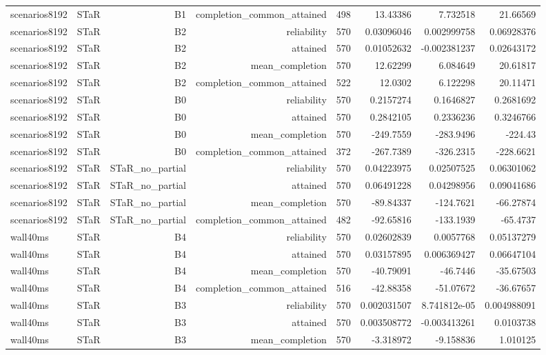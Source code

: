 \begin{longtable}{llrrrrrr}
scenarios8192 & STaR & B1 & completion\_common\_attained & 498 & 13.43386 & 7.732518 & 21.66569 \\
scenarios8192 & STaR & B2 & reliability & 570 & 0.03096046 & 0.002999758 & 0.06928376 \\
scenarios8192 & STaR & B2 & attained & 570 & 0.01052632 & -0.002381237 & 0.02643172 \\
scenarios8192 & STaR & B2 & mean\_completion & 570 & 12.62299 & 6.084649 & 20.61817 \\
scenarios8192 & STaR & B2 & completion\_common\_attained & 522 & 12.0302 & 6.122298 & 20.11471 \\
scenarios8192 & STaR & B0 & reliability & 570 & 0.2157274 & 0.1646827 & 0.2681692 \\
scenarios8192 & STaR & B0 & attained & 570 & 0.2842105 & 0.2336236 & 0.3246766 \\
scenarios8192 & STaR & B0 & mean\_completion & 570 & -249.7559 & -283.9496 & -224.43 \\
scenarios8192 & STaR & B0 & completion\_common\_attained & 372 & -267.7389 & -326.2315 & -228.6621 \\
scenarios8192 & STaR & STaR\_no\_partial & reliability & 570 & 0.04223975 & 0.02507525 & 0.06301062 \\
scenarios8192 & STaR & STaR\_no\_partial & attained & 570 & 0.06491228 & 0.04298956 & 0.09041686 \\
scenarios8192 & STaR & STaR\_no\_partial & mean\_completion & 570 & -89.84337 & -124.7621 & -66.27874 \\
scenarios8192 & STaR & STaR\_no\_partial & completion\_common\_attained & 482 & -92.65816 & -133.1939 & -65.4737 \\
wall40ms & STaR & B4 & reliability & 570 & 0.02602839 & 0.0057768 & 0.05137279 \\
wall40ms & STaR & B4 & attained & 570 & 0.03157895 & 0.006369427 & 0.06647104 \\
wall40ms & STaR & B4 & mean\_completion & 570 & -40.79091 & -46.7446 & -35.67503 \\
wall40ms & STaR & B4 & completion\_common\_attained & 516 & -42.88358 & -51.07672 & -36.67657 \\
wall40ms & STaR & B3 & reliability & 570 & 0.002031507 & 8.741812e-05 & 0.004988091 \\
wall40ms & STaR & B3 & attained & 570 & 0.003508772 & -0.003413261 & 0.0103738 \\
wall40ms & STaR & B3 & mean\_completion & 570 & -3.318972 & -9.158836 & 1.010125 \\

\end{longtable}
